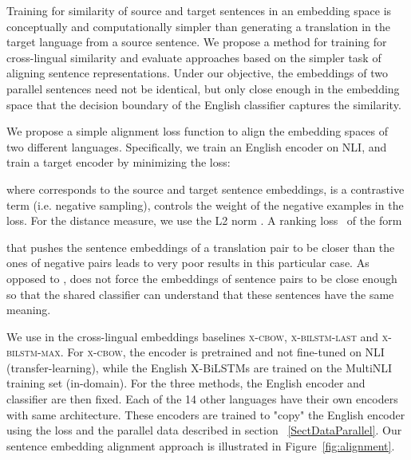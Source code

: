 \documentclass[11pt,a4paper]{article}
\begin{document}
Training for similarity of source and target sentences in an embedding space is conceptually and computationally simpler than generating a translation in the target language from a source sentence.
We propose a method for training for cross-lingual similarity and evaluate approaches based on the simpler task of aligning sentence representations. Under our objective, the embeddings of two parallel sentences need not be identical, but only close enough in the embedding space that the decision boundary of the English classifier captures the similarity.


We propose a simple alignment loss function to align the embedding spaces of two different languages. Specifically, we train an English encoder on NLI, and train a target encoder by minimizing the loss:

\vspace{-0.23cm}
{\small}
\vspace{-0.5cm}

where  corresponds to the source and target sentence embeddings,  is a contrastive term (i.e. negative sampling),  controls the weight of the negative examples in the loss. For the distance measure, we use the L2 norm . A ranking loss~\cite{weston2011wsabie} of the form

\vspace{-0.23cm}
{\small

}
\vspace{-0.5cm}

that pushes the sentence embeddings of a translation pair to be closer than the ones of negative pairs leads to very poor results in this particular case. As opposed to ,  does not force the embeddings of sentence pairs to be close enough so that the shared classifier can understand that these sentences have the same meaning.

We use  in the cross-lingual embeddings baselines \textsc{x-cbow}, \textsc{x-bilstm-last} and \textsc{x-bilstm-max}. For \textsc{x-cbow}, the encoder is pretrained and not fine-tuned on NLI (transfer-learning), while the English X-BiLSTMs are trained on the MultiNLI training set (in-domain). For the three methods, the English encoder and classifier are then fixed. Each of the 14 other languages have their own encoders with same architecture. These encoders are trained to "copy" the English encoder using the  loss and the parallel data described in section ~\ref{SectDataParallel}. Our sentence embedding alignment approach is illustrated in Figure~\ref{fig:alignment}.
\end{document}
